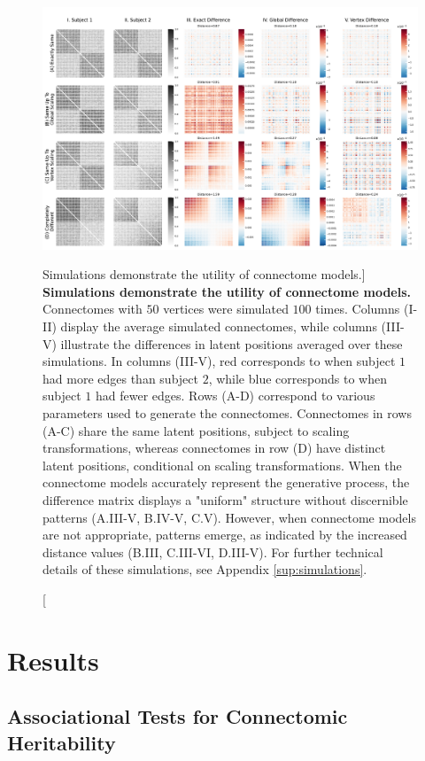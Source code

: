 \begin{figure}
    \centering
    \includegraphics[width=\linewidth]{figures/herit/3-simulations.pdf}
    \caption
    [Simulations demonstrate the utility of connectome models.]
    {\textbf{Simulations demonstrate the utility of connectome models.} Connectomes with $50$ vertices were simulated $100$ times. Columns (I-II) display the average simulated connectomes, while columns {(III-V)} illustrate the differences in latent positions averaged over these simulations. In columns (III-V), red corresponds to when subject $1$ had more edges than subject $2$, while blue corresponds to when subject $1$ had fewer edges. Rows (A-D) correspond to various parameters used to generate the connectomes. Connectomes in rows (A-C) share the same latent positions, subject to scaling transformations, whereas connectomes in row (D) have distinct latent positions, conditional on scaling transformations. When the connectome models accurately represent the generative process, the difference matrix displays a "uniform" structure without discernible patterns (A.III-V, B.IV-V, C.V). However, when connectome models are not appropriate, patterns emerge, as indicated by the increased distance values (B.III, C.III-VI, D.III-V).
    For further technical details of these simulations, see Appendix \ref{sup:simulations}.}
    \label{fig:simulations}
\end{figure} 

\section{Results}

\subsection{Associational Tests for Connectomic Heritability} 

